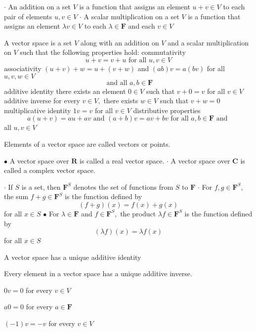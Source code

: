 
$\cdot$ An addition on a set $V$ is a function that assigns an element $u+v \in V$
to each pair of elements $u, v \in V$
$\cdot$ A scalar multiplication on a set $V$ is a function that assigns an element $\lambda v \in V$ to each $\lambda \in \mathbf{F}$ and each $v \in V$

A vector space is a set $V$ along with an addition on $V$ and a scalar multiplication on $V$ such that the following properties hold:
commutativity
$$
u+v=v+u \text { for all } u, v \in V
$$
associativity $(u+v)+w=u+(v+w)$ and $(a b) v=a(b v)$ for all $u, v, w \in V$
$$
\text { and all } a, b \in \mathbf{F}
$$
additive identity there exists an element $0 \in V$ such that $v+0=v$ for all $v \in V$
additive inverse
for every $v \in V,$ there exists $w \in V$ such that $v+w=0$
multiplicative identity
$1 v=v$ for all $v \in V$
distributive properties
$$
a(u+v)=a u+a v \text { and }(a+b) v=a v+b v \text { for all } a, b \in \mathbf{F} \text { and }
$$
all $u, v \in V$

Elements of a vector space are called vectors or points.

$\bullet$ A vector space over $\mathbf{R}$ is called a real vector space.
$\cdot$ A vector space over $\mathbf{C}$ is called a complex vector space.

$\cdot$ If $S$ is a set, then $\mathbf{F}^{S}$ denotes the set of functions from $S$ to $\mathbf{F}$
$\cdot$ For $f, g \in \mathbf{F}^{S},$ the sum $f+g \in \mathbf{F}^{S}$ is the function defined by
$$
(f+g)(x)=f(x)+g(x)
$$
for all $x \in S$
$\bullet$ For $\lambda \in \mathbf{F}$ and $f \in \mathbf{F}^{S},$ the product $\lambda f \in \mathbf{F}^{S}$ is the function defined by
$$
(\lambda f)(x)=\lambda f(x)
$$
for all $x \in S$

A vector space has a unique additive identity

Every element in a vector space has a unique additive inverse.

$0 v=0$ for every $v \in V$

$a 0=0$ for every $a \in \mathbf{F}$

$(-1) v=-v$ for every $v \in V$